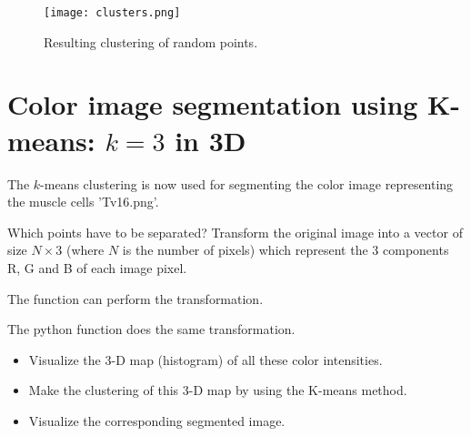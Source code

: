 \vspace*{-8pt}

\begin{figure}[htbp]
\centering\caption{Resulting clustering of random points.}%
\texttt{[image: clusters.png]}%
 \label{fig:histoseg:kmeans}%
\end{figure}

\vspace*{-8pt}

\section{Color image segmentation using K-means: $k=3$ in 3D}

The $k$-means clustering is now used for segmenting the color image representing the muscle cells 'Tv16.png'.

\begin{qbox}
Which points have to be separated? Transform the original image into a vector of size $N\times 3$ (where $N$ is the number of pixels) which represent the $3$ components R, G and B of each image pixel.
\end{qbox}

 \begin{mcomment}
\begin{mremark}The \matlabregistered{} function  can perform the transformation.
 \end{mremark}
\end{mcomment}
\begin{pcomment}
\begin{premark}
The python function  does the same transformation.
\end{premark}
\end{pcomment}

\begin{qbox} 
 \begin{itemize}
 \item Visualize the 3-D map (histogram) of all these color intensities.
 \item Make the clustering of this 3-D map by using the K-means method. 
 \item Visualize the corresponding segmented image.
\end{itemize}
\end{qbox}
